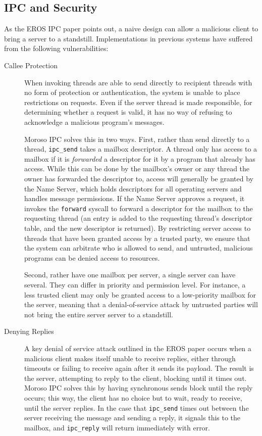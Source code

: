 \documentclass{article}
\begin{document}
\subsection{IPC and Security}
As the EROS IPC paper points out, a naive design can allow a malicious client to bring a server to a standstill.  Implementations in previous systems have suffered from the following vulnerabilities:
\begin{description}
\item[Callee Protection]  When invoking threads are able to send directly to recipient threads with no form of protection or authentication, the system is unable to place restrictions on requests.  Even if the server thread is made responsible, for determining whether a request is valid, it has no way of refusing to acknowledge a malicious program's messages. 

Moroso IPC solves this in two ways.  First, rather than send directly to a thread, \verb|ipc_send| takes a mailbox descriptor.  A thread only has access to a mailbox if it is \emph{forwarded} a descriptor for it by a program that already has access.  While this can be done by the mailbox's owner or any thread the owner has forwarded the descriptor to, access will generally be granted by the Name Server, which holds descriptors for all operating servers and handles message permissions.  If the Name Server approves a request, it invokes the \verb|forward| syscall to forward a descriptor for the mailbox to the requesting thread (an entry is added to the requesting thread's descriptor table, and the new descriptor is returned).  By restricting server access to threads that have been granted access by a trusted party, we ensure that the system can arbitrate who is allowed to send, and untrusted, malicious programs can be denied access to resources.  

Second, rather have one mailbox per server, a single server can have several.   They can differ in priority and permission level.  For instance, a less trusted client may only be granted access to a low-priority mailbox for the server, meaning that a denial-of-service attack by untrusted parties will not bring the entire server server to a standstill.  

\item[Denying Replies]  A key denial of service attack outlined in the EROS paper occurs when a malicious client makes itself unable to receive replies, either through timeouts or failing to receive again after it sends its payload.  The result is the server, attempting to reply to the client, blocking until it times out.  Moroso IPC solves this by having synchronous sends block until the reply occurs; this way, the client has no choice but to wait, ready to receive, until the server replies.  In the case that \verb|ipc_send| times out between the server receiving the message and sending a reply, it signals this to the mailbox, and \verb|ipc_reply| will return immediately with error.


\end{description}
\end{document}
